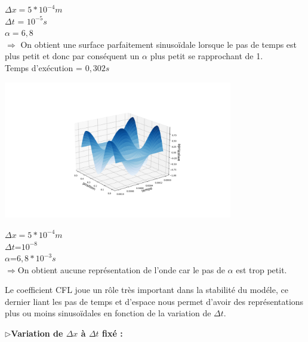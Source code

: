 \begin{enumerate}[label=\alph*)]
\begin{minipage}{.5\textwidth}%
\item $\Delta x = 5*{10}^{-4}m$\\
$\Delta t$ = ${10}^{-5} s $ \\
$\alpha =6,8$\\

$\Longrightarrow$ On obtient une surface parfaitement  sinusoïdale lorsque le pas de temps est plus petit et donc par conséquent un $\alpha$ plus petit se rapprochant de 1.\\ 
Temps d'exécution = $0,302s$
\end{minipage}%
\hfill
\begin{minipage}{.45\textwidth}%
\includegraphics[width=10cm,height=6cm]{implicited.png}
\end{minipage}%




\begin{minipage}{.8\textwidth}%

\item $\Delta x=5*{10}^{-4}m$\\
$\Delta t$=${10}^{-8}$\\
$\alpha$=$6,8*{10}^{-3}s$\\


$\Longrightarrow$On obtient aucune représentation de l'onde car le pas de $\alpha$ est trop petit.\\

\end{minipage}%
\newline
\newline
Le coefficient CFL joue un rôle très important dans la stabilité du modéle, ce dernier liant les pas de temps et d'espace nous permet d'avoir des représentations plus ou moins sinusoïdales en fonction de la variation de $\Delta t$.
\end{enumerate}

$\triangleright$\textbf{Variation de  $\Delta x$ à $\Delta t$ fixé :}\\

